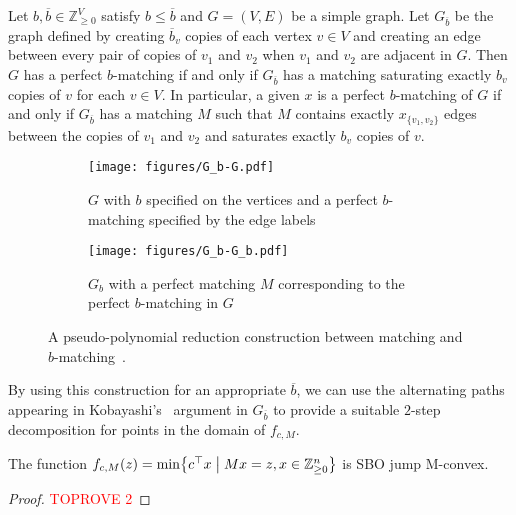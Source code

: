\documentclass[a4paper,UKenglish,cleveref,thm-restate]{lipics-v2021}
\newcommand{\Z}{\mathbb Z}
\begin{document}
\begin{proposition}
    Let $b,\overline b\in\mathbb Z_{\ge0}^V$ satisfy $b\le\overline b$ and $G=(V,E)$ be a simple graph. Let $G_{\overline b}$ be the graph defined by creating $\overline b_v$ copies of each vertex $v\in V$ and creating an edge between every pair of copies of $v_1$ and $v_2$ when $v_1$ and $v_2$ are adjacent in $G$. Then $G$ has a perfect $b$-matching if and only if $G_{\overline b}$ has a matching saturating exactly $b_v$ copies of $v$ for each $v\in V$. In particular, a given $x$ is a perfect $b$-matching of $G$ if and only if $G_{\overline b}$ has a matching $M$ such that $M$ contains exactly $x_{\{v_1,v_2\}}$ edges between the copies of $v_1$ and $v_2$ and saturates exactly $b_v$ copies of $v$.
    \label{prop:gb}
\end{proposition}

\begin{figure}
    \begin{subfigure}{0.45\textwidth}
        \centering
        \texttt{[image: figures/G\_b-G.pdf]}
        \caption{$G$ with $b$ specified on the vertices and a perfect $b$-matching specified by the edge labels}
    \end{subfigure}
    \hspace{0.05\textwidth}
    \begin{subfigure}{0.45\textwidth}
        \centering
        \texttt{[image: figures/G\_b-G\_b.pdf]}
        \caption{$G_b$ with a perfect matching $M$ corresponding to the perfect $b$-matching in $G$}
    \end{subfigure}
    \caption{A pseudo-polynomial reduction construction between matching and $b$-matching~\cite{schrijver2003combinatorial}.}
    \label{fig:G_b}
\end{figure}

By using this construction for an appropriate $\overline b$, we can use the alternating paths appearing in Kobayashi's~\cite{DBLP:conf/ipco/Kobayashi23} argument in $G_{\overline b}$ to provide a suitable $2$-step decomposition for points in the domain of $f_{c,M}$.

\begin{proposition}
    The function $f_{c,M}(z)=\min\bigl\{c^\top x\bigm\vert Mx=z,x\in\Z_{\ge0}^n\bigr\}$ is SBO jump M-convex.
    \label{prop:b-matching-is-sbo-jump-m-convex}
\end{proposition}

\begin{proof}\textcolor{red}{TOPROVE 2}\end{proof}
\end{document}
